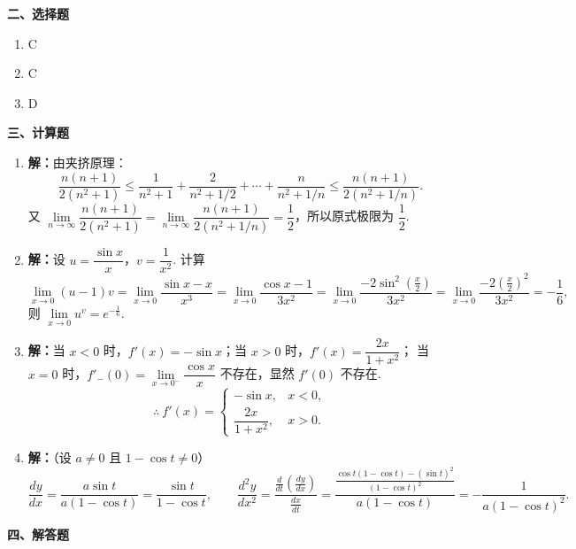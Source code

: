 \documentclass[a4paper,11pt]{ctexart}
\begin{document}
\vspace{0.6em}
\textbf{二、选择题}

\begin{enumerate}[label=\arabic*., leftmargin=2em, itemsep=0.5em, topsep=0.4em]
  \item C
  \item C
  \item D
\end{enumerate}

\vspace{0.6em}
\textbf{三、计算题}

\begin{enumerate}[label=\arabic*., leftmargin=2em, itemsep=0.9em, topsep=0.4em]
  \item \textbf{解：}由夹挤原理：
  \[
    \frac{n(n+1)}{2(n^2+1)} \le \frac{1}{n^2+1}+\frac{2}{n^2+1/2}+\cdots+\frac{n}{n^2+1/n} \le \frac{n(n+1)}{2(n^2+1/n)}.
  \]
  又 $\lim\limits_{n\to\infty}\dfrac{n(n+1)}{2(n^2+1)}=\lim\limits_{n\to\infty}\dfrac{n(n+1)}{2(n^2+1/n)}=\dfrac{1}{2}$，所以原式极限为 $\dfrac{1}{2}$.

  \item \textbf{解：}设 $u=\dfrac{\sin x}{x}$，$v=\dfrac{1}{x^2}$. 计算
  \[
    \lim_{x\to 0}(u-1)v
    = \lim_{x\to 0}\frac{\sin x-x}{x^3}
    = \lim_{x\to 0}\frac{\cos x-1}{3x^2}
    = \lim_{x\to 0}\frac{-2\sin^2\left(\frac{x}{2}\right)}{3x^2}
    = \lim_{x\to 0}\frac{-2\left(\frac{x}{2}\right)^2}{3x^2}
    = -\frac{1}{6},
  \]
  则 $\lim\limits_{x\to 0}u^v=e^{-\frac{1}{6}}$.

  \item \textbf{解：}当 $x<0$ 时，$f'(x)=-\sin x$；当 $x>0$ 时，$f'(x)=\dfrac{2x}{1+x^2}$；
  当 $x=0$ 时，$f'_-(0)=\lim\limits_{x\to 0^-}\dfrac{\cos x}{x}$ 不存在，显然 $f'(0)$ 不存在.
  \[
    \therefore\ f'(x)=\begin{cases} -\sin x, & x<0, \\ \dfrac{2x}{1+x^2}, & x>0. \end{cases}
  \]

  \item \textbf{解：}（设 $a\neq 0$ 且 $1-\cos t\neq 0$）
  \[
    \frac{dy}{dx}=\frac{a\sin t}{a(1-\cos t)}=\frac{\sin t}{1-\cos t},\qquad
    \frac{d^2y}{dx^2}=\frac{\frac{d}{dt}\left(\frac{dy}{dx}\right)}{\frac{dx}{dt}}
    =\frac{\frac{\cos t(1-\cos t)-(\sin t)^2}{(1-\cos t)^2}}{a(1-\cos t)}
    =-\frac{1}{a(1-\cos t)^2}.
  \]
\end{enumerate}

\vspace{0.6em}
\textbf{四、解答题}
\end{document}
